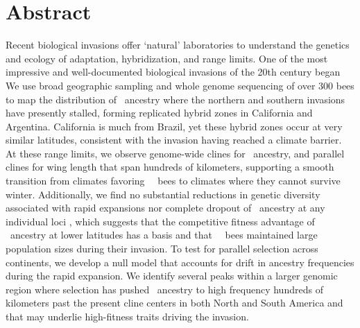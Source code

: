 \section*{Abstract}
Recent biological invasions offer ‘natural’ laboratories to understand the genetics and ecology of adaptation, hybridization, and range limits. One of the most impressive and well-documented biological invasions of the 20th century began   
We use broad geographic sampling and whole genome sequencing of over 300 bees to map the distribution of \scutellata\ ancestry where the northern and southern invasions have presently stalled, forming replicated hybrid zones  in California and Argentina. California is much  from Brazil, yet these hybrid zones occur at very similar latitudes, consistent with the invasion having reached a climate barrier. At these range limits, we observe genome-wide clines for \scutellata\ ancestry, and parallel clines for wing length that span hundreds of kilometers, supporting a smooth transition from climates favoring \africanized\ \hyb\ bees to climates where they cannot survive winter.  Additionally, we find no substantial reductions in genetic diversity associated with rapid expansions nor complete dropout of \scutellata\ ancestry at any individual loci , which suggests that the competitive fitness advantage of \scutellata\ ancestry at lower latitudes has a  basis and that \africanized\ \hyb\ bees maintained large population sizes during their invasion. To test for parallel selection across continents, we develop a null model that accounts for drift in ancestry frequencies during the rapid expansion. We identify several peaks within a larger genomic region where selection has pushed \scutellata\ ancestry to high frequency hundreds of kilometers past the present cline centers in both North and South America and that may underlie high-fitness traits driving the invasion.

